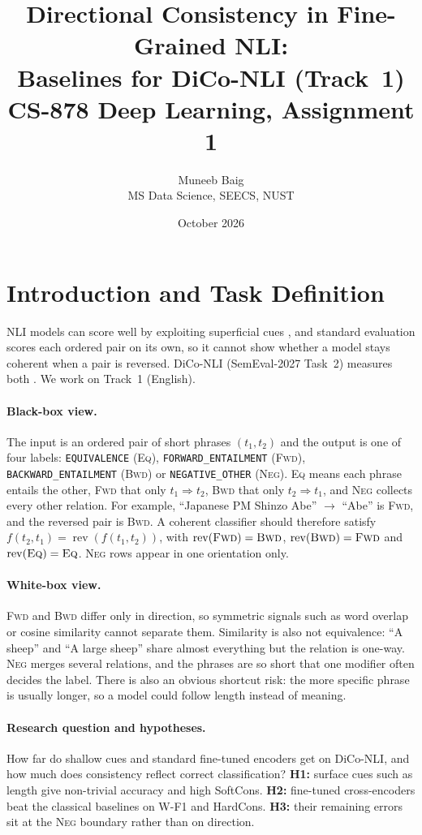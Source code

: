 \documentclass[11pt,a4paper]{article}
\title{Directional Consistency in Fine-Grained NLI:\\
Baselines for DiCo-NLI (Track~1)\\[4pt]
\large CS-878 Deep Learning, Assignment 1}
\author{Muneeb Baig\\ MS Data Science, SEECS, NUST}
\date{October 2026}
\newcommand{\EQ}{\textsc{Eq}}
\newcommand{\FWD}{\textsc{Fwd}}
\newcommand{\BWD}{\textsc{Bwd}}
\newcommand{\NEG}{\textsc{Neg}}
\DeclareMathOperator{\rev}{rev}
\begin{document}
\maketitle

\section{Introduction and Task Definition}
\label{sec:intro}

NLI models can score well by exploiting superficial cues \citep{gururangan2018annotation}, and standard evaluation scores each ordered pair on its own, so it cannot show whether a model stays coherent when a pair is reversed. DiCo-NLI (SemEval-2027 Task~2) measures both \citep{diconli2026}. We work on Track~1 (English).

\paragraph{Black-box view.} The input is an ordered pair of short phrases $(t_1,t_2)$ and the output is one of four labels: \texttt{EQUIVALENCE} (\EQ), \texttt{FORWARD\_ENTAILMENT} (\FWD), \texttt{BACKWARD\_ENTAILMENT} (\BWD) or \texttt{NEGATIVE\_OTHER} (\NEG). \EQ{} means each phrase entails the other, \FWD{} that only $t_1\Rightarrow t_2$, \BWD{} that only $t_2\Rightarrow t_1$, and \NEG{} collects every other relation. For example, ``Japanese PM Shinzo Abe'' $\rightarrow$ ``Abe'' is \FWD, and the reversed pair is \BWD. A coherent classifier should therefore satisfy $f(t_2,t_1)=\rev(f(t_1,t_2))$, with $\rev(\FWD)=\BWD$, $\rev(\BWD)=\FWD$ and $\rev(\EQ)=\EQ$. \NEG{} rows appear in one orientation only.

\paragraph{White-box view.} \FWD{} and \BWD{} differ only in direction, so symmetric signals such as word overlap or cosine similarity cannot separate them. Similarity is also not equivalence: ``A sheep'' and ``A large sheep'' share almost everything but the relation is one-way. \NEG{} merges several relations, and the phrases are so short that one modifier often decides the label. There is also an obvious shortcut risk: the more specific phrase is usually longer, so a model could follow length instead of meaning.

\paragraph{Research question and hypotheses.} How far do shallow cues and standard fine-tuned encoders get on DiCo-NLI, and how much does consistency reflect correct classification? \textbf{H1:} surface cues such as length give non-trivial accuracy and high SoftCons. \textbf{H2:} fine-tuned cross-encoders beat the classical baselines on W-F1 and HardCons. \textbf{H3:} their remaining errors sit at the \NEG{} boundary rather than on direction.
\end{document}
